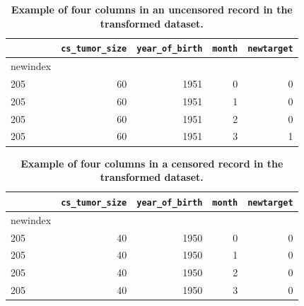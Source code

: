 \documentclass[10pt,letterpaper]{article}
\newcommand{\codewhite}[1]{\colorbox{white}{\texttt{#1}}}
\begin{document}
\begin{table}[!ht]
\begin{adjustwidth}{-2.25in}{0in} %
\caption{\label{tab:transformeddead} {\bf Example of four columns in an uncensored record in the transformed dataset.}}
\begin{tabular}{lrrrr}
\toprule
{} &  \codewhite{cs\_tumor\_size} &  \codewhite{year\_of\_birth} &  \codewhite{month} &  \codewhite{newtarget} \\
\midrule
newindex &                &                &        &            \\
205      &             60 &           1951 &      0 &          0 \\
205      &             60 &           1951 &      1 &          0 \\
205      &             60 &           1951 &      2 &          0 \\
205      &             60 &           1951 &      3 &          1 \\
\bottomrule
\end{tabular}
\end{adjustwidth}
\end{table}


\begin{table}[tbp]
\begin{adjustwidth}{-2.25in}{0in} %
\caption{\label{tab:transformedalive} {\bf Example of four columns in a censored record in the transformed dataset.}}
\begin{tabular}{lrrrr}
\toprule
{} &  \codewhite{cs\_tumor\_size} &  \codewhite{year\_of\_birth} &  \codewhite{month} &  \codewhite{newtarget} \\
\midrule
newindex &                &                &        &            \\
205      &             40 &           1950 &      0 &          0 \\
205      &             40 &           1950 &      1 &          0 \\
205      &             40 &           1950 &      2 &          0 \\
205      &             40 &           1950 &      3 &          0 \\
\bottomrule
\end{tabular}
\end{adjustwidth}
\end{table}
\end{document}
